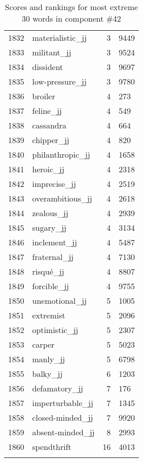 \begin{longtable}[!htbp]{| rlr@{.}l |}
    1832 & materialistic\_jj & 3 & 9449 \\
    1833 & militant\_jj & 3 & 9524 \\
    1834 & dissident & 3 & 9697 \\
    1835 & low-pressure\_jj & 3 & 9780 \\
    1836 & broiler & 4 & 273 \\
    1837 & feline\_jj & 4 & 549 \\
    1838 & cassandra & 4 & 664 \\
    1839 & chipper\_jj & 4 & 820 \\
    1840 & philanthropic\_jj & 4 & 1658 \\
    1841 & heroic\_jj & 4 & 2318 \\
    1842 & imprecise\_jj & 4 & 2519 \\
    1843 & overambitious\_jj & 4 & 2618 \\
    1844 & zealous\_jj & 4 & 2939 \\
    1845 & sugary\_jj & 4 & 3134 \\
    1846 & inclement\_jj & 4 & 5487 \\
    1847 & fraternal\_jj & 4 & 7130 \\
    1848 & risqué\_jj & 4 & 8807 \\
    1849 & forcible\_jj & 4 & 9755 \\
    1850 & unemotional\_jj & 5 & 1005 \\
    1851 & extremist & 5 & 2096 \\
    1852 & optimistic\_jj & 5 & 2307 \\
    1853 & carper & 5 & 5023 \\
    1854 & manly\_jj & 5 & 6798 \\
    1855 & balky\_jj & 6 & 1203 \\
    1856 & defamatory\_jj & 7 & 176 \\
    1857 & imperturbable\_jj & 7 & 1345 \\
    1858 & closed-minded\_jj & 7 & 9920 \\
    1859 & absent-minded\_jj & 8 & 2993 \\
    1860 & spendthrift & 16 & 4013 \\
    \hline
    \caption{Scores and rankings for most extreme 30 words in component \#42} \\
\end{longtable}
